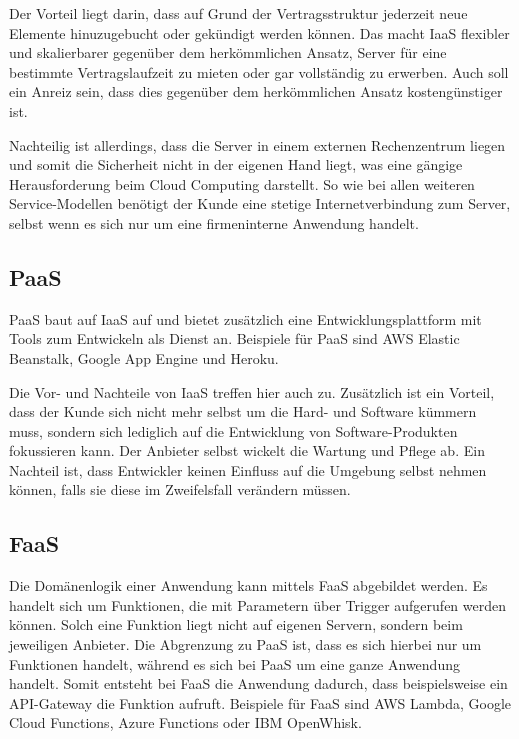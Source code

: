 Der Vorteil liegt darin, dass auf Grund der Vertragsstruktur jederzeit neue Elemente hinuzugebucht oder gekündigt werden können. Das macht \acl{IaaS} flexibler und skalierbarer gegenüber dem herkömmlichen Ansatz, Server für eine bestimmte Vertragslaufzeit zu mieten oder gar vollständig zu erwerben. Auch soll ein Anreiz sein, dass dies gegenüber dem herkömmlichen Ansatz kostengünstiger ist.

Nachteilig ist allerdings, dass die Server in einem externen Rechenzentrum liegen und somit die Sicherheit nicht in der eigenen Hand liegt, was eine gängige Herausforderung beim Cloud Computing darstellt. So wie bei allen weiteren Service-Modellen benötigt der Kunde eine stetige Internetverbindung zum Server, selbst wenn es sich nur um eine firmeninterne Anwendung handelt.

\subsection{\acl{PaaS}}

\acf{PaaS} baut auf \acl{IaaS} auf und bietet zusätzlich eine Entwicklungsplattform mit Tools zum Entwickeln als Dienst an. Beispiele für \ac{PaaS} sind \ac{AWS} Elastic Beanstalk, Google App Engine und Heroku.

Die Vor- und Nachteile von \acl{IaaS} treffen hier auch zu. Zusätzlich ist ein Vorteil, dass der Kunde sich nicht mehr selbst um die Hard- und Software kümmern muss, sondern sich lediglich auf die Entwicklung von Software-Produkten fokussieren kann. Der Anbieter selbst wickelt die Wartung und Pflege ab. Ein Nachteil ist, dass Entwickler keinen Einfluss auf die Umgebung selbst nehmen können, falls sie diese im Zweifelsfall verändern müssen.

\subsection{\acl{FaaS}}

Die Domänenlogik einer Anwendung kann mittels \acf{FaaS} abgebildet werden. Es handelt sich um Funktionen, die mit Parametern über Trigger aufgerufen werden können. Solch eine Funktion liegt nicht auf eigenen Servern, sondern beim jeweiligen Anbieter. Die Abgrenzung zu \ac{PaaS} ist, dass es sich hierbei nur um Funktionen handelt, während es sich bei \ac{PaaS} um eine ganze Anwendung handelt. Somit entsteht bei \ac{FaaS} die Anwendung dadurch, dass beispielsweise ein API-Gateway die Funktion aufruft. Beispiele für \ac{FaaS} sind \ac{AWS} Lambda, Google Cloud Functions, Azure Functions oder IBM OpenWhisk.

